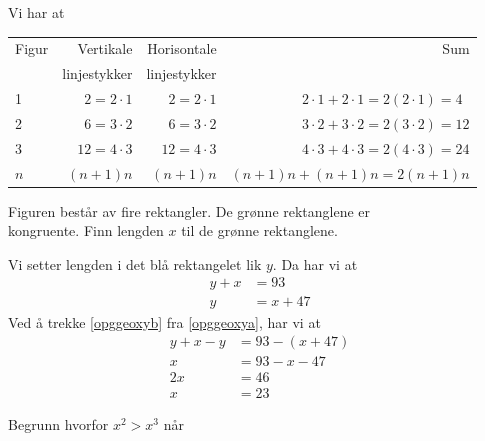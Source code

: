 \sv
Vi har at
\begin{center}
	\small
	\begin{tabular}{|l | r| r| r|}
		\hline
		Figur& Vertikale & Horisontale & Sum \\ 
		& linjestykker & linjestykker & \\ \hline
		1 & $2=2\cdot1$ & $2=2\cdot1$ & $2\cdot1+2\cdot1=2(2\cdot1)=4\phantom{0}$ \\
		2 & $6=3\cdot2$ & $6=3\cdot2$ & $3\cdot2+3\cdot2=2(3\cdot2)=12$ \\
		3 & $12=4\cdot3$ & $12=4\cdot3$ & $4\cdot3+4\cdot3=2(4\cdot3)=24$ \\
		$n$ & $(n+1)n$ & $(n+1)n$ & $(n+1)n+(n+1)n=2(n+1)n$
	\end{tabular}
\end{center}

\newpage
{}
Figuren består av fire rektangler. De grønne rektanglene er\\ kongruente. Finn lengden $x$ til de grønne rektanglene.

\sv
Vi setter lengden i det blå rektangelet lik $y$. Da har vi at
\begin{align*}
	y+x &= 93 \tag{i} \label{opggeoxya}\\
	y&=x+47 \tag{ii} \label{opggeoxyb}
\end{align*}
Ved å trekke \eqref{opggeoxyb} fra \eqref{opggeoxya}, har vi at
\begin{align*}
	y+x-y &= 93-(x+47) \\
	x &= 93-x-47 \\
	2x &= 46 \\
	x &= 23
\end{align*}


\newpage
{}
Begrunn hvorfor $x^2>x^3$ når \os
{}


